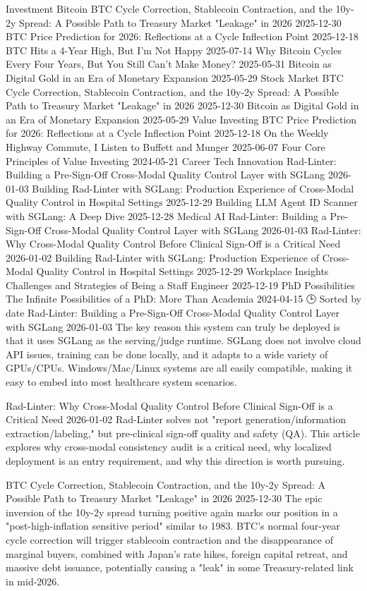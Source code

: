 Investment
Bitcoin
BTC Cycle Correction, Stablecoin Contraction, and the 10y-2y Spread: A Possible Path to Treasury Market "Leakage" in 2026
2025-12-30
BTC Price Prediction for 2026: Reflections at a Cycle Inflection Point
2025-12-18
BTC Hits a 4-Year High, But I'm Not Happy
2025-07-14
Why Bitcoin Cycles Every Four Years, But You Still Can't Make Money?
2025-05-31
Bitcoin as Digital Gold in an Era of Monetary Expansion
2025-05-29
Stock Market
BTC Cycle Correction, Stablecoin Contraction, and the 10y-2y Spread: A Possible Path to Treasury Market "Leakage" in 2026
2025-12-30
Bitcoin as Digital Gold in an Era of Monetary Expansion
2025-05-29
Value Investing
BTC Price Prediction for 2026: Reflections at a Cycle Inflection Point
2025-12-18
On the Weekly Highway Commute, I Listen to Buffett and Munger
2025-06-07
Four Core Principles of Value Investing
2024-05-21
Career
Tech Innovation
Rad-Linter: Building a Pre-Sign-Off Cross-Modal Quality Control Layer with SGLang
2026-01-03
Building Rad-Linter with SGLang: Production Experience of Cross-Modal Quality Control in Hospital Settings
2025-12-29
Building LLM Agent ID Scanner with SGLang: A Deep Dive
2025-12-28
Medical AI
Rad-Linter: Building a Pre-Sign-Off Cross-Modal Quality Control Layer with SGLang
2026-01-03
Rad-Linter: Why Cross-Modal Quality Control Before Clinical Sign-Off is a Critical Need
2026-01-02
Building Rad-Linter with SGLang: Production Experience of Cross-Modal Quality Control in Hospital Settings
2025-12-29
Workplace Insights
Challenges and Strategies of Being a Staff Engineer
2025-12-19
PhD Possibilities
The Infinite Possibilities of a PhD: More Than Academia
2024-04-15
🕒 Sorted by date
Rad-Linter: Building a Pre-Sign-Off Cross-Modal Quality Control Layer with SGLang
2026-01-03
The key reason this system can truly be deployed is that it uses SGLang as the serving/judge runtime. SGLang does not involve cloud API issues, training can be done locally, and it adapts to a wide variety of GPUs/CPUs. Windows/Mac/Linux systems are all easily compatible, making it easy to embed into most healthcare system scenarios.

Rad-Linter: Why Cross-Modal Quality Control Before Clinical Sign-Off is a Critical Need
2026-01-02
Rad-Linter solves not "report generation/information extraction/labeling," but pre-clinical sign-off quality and safety (QA). This article explores why cross-modal consistency audit is a critical need, why localized deployment is an entry requirement, and why this direction is worth pursuing.

BTC Cycle Correction, Stablecoin Contraction, and the 10y-2y Spread: A Possible Path to Treasury Market "Leakage" in 2026
2025-12-30
The epic inversion of the 10y-2y spread turning positive again marks our position in a "post-high-inflation sensitive period" similar to 1983. BTC's normal four-year cycle correction will trigger stablecoin contraction and the disappearance of marginal buyers, combined with Japan's rate hikes, foreign capital retreat, and massive debt issuance, potentially causing a "leak" in some Treasury-related link in mid-2026.

